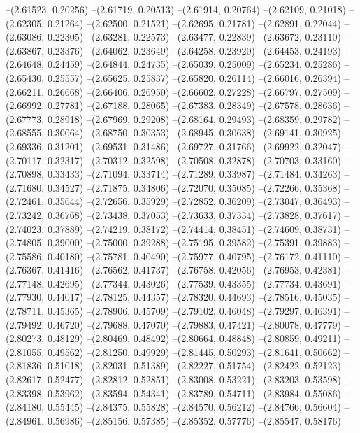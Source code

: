 --(2.61523, 0.20256)
--(2.61719, 0.20513)
--(2.61914, 0.20764)
--(2.62109, 0.21018)
--(2.62305, 0.21264)
--(2.62500, 0.21521)
--(2.62695, 0.21781)
--(2.62891, 0.22044)
--(2.63086, 0.22305)
--(2.63281, 0.22573)
--(2.63477, 0.22839)
--(2.63672, 0.23110)
--(2.63867, 0.23376)
--(2.64062, 0.23649)
--(2.64258, 0.23920)
--(2.64453, 0.24193)
--(2.64648, 0.24459)
--(2.64844, 0.24735)
--(2.65039, 0.25009)
--(2.65234, 0.25286)
--(2.65430, 0.25557)
--(2.65625, 0.25837)
--(2.65820, 0.26114)
--(2.66016, 0.26394)
--(2.66211, 0.26668)
--(2.66406, 0.26950)
--(2.66602, 0.27228)
--(2.66797, 0.27509)
--(2.66992, 0.27781)
--(2.67188, 0.28065)
--(2.67383, 0.28349)
--(2.67578, 0.28636)
--(2.67773, 0.28918)
--(2.67969, 0.29208)
--(2.68164, 0.29493)
--(2.68359, 0.29782)
--(2.68555, 0.30064)
--(2.68750, 0.30353)
--(2.68945, 0.30638)
--(2.69141, 0.30925)
--(2.69336, 0.31201)
--(2.69531, 0.31486)
--(2.69727, 0.31766)
--(2.69922, 0.32047)
--(2.70117, 0.32317)
--(2.70312, 0.32598)
--(2.70508, 0.32878)
--(2.70703, 0.33160)
--(2.70898, 0.33433)
--(2.71094, 0.33714)
--(2.71289, 0.33987)
--(2.71484, 0.34263)
--(2.71680, 0.34527)
--(2.71875, 0.34806)
--(2.72070, 0.35085)
--(2.72266, 0.35368)
--(2.72461, 0.35644)
--(2.72656, 0.35929)
--(2.72852, 0.36209)
--(2.73047, 0.36493)
--(2.73242, 0.36768)
--(2.73438, 0.37053)
--(2.73633, 0.37334)
--(2.73828, 0.37617)
--(2.74023, 0.37889)
--(2.74219, 0.38172)
--(2.74414, 0.38451)
--(2.74609, 0.38731)
--(2.74805, 0.39000)
--(2.75000, 0.39288)
--(2.75195, 0.39582)
--(2.75391, 0.39883)
--(2.75586, 0.40180)
--(2.75781, 0.40490)
--(2.75977, 0.40795)
--(2.76172, 0.41110)
--(2.76367, 0.41416)
--(2.76562, 0.41737)
--(2.76758, 0.42056)
--(2.76953, 0.42381)
--(2.77148, 0.42695)
--(2.77344, 0.43026)
--(2.77539, 0.43355)
--(2.77734, 0.43691)
--(2.77930, 0.44017)
--(2.78125, 0.44357)
--(2.78320, 0.44693)
--(2.78516, 0.45035)
--(2.78711, 0.45365)
--(2.78906, 0.45709)
--(2.79102, 0.46048)
--(2.79297, 0.46391)
--(2.79492, 0.46720)
--(2.79688, 0.47070)
--(2.79883, 0.47421)
--(2.80078, 0.47779)
--(2.80273, 0.48129)
--(2.80469, 0.48492)
--(2.80664, 0.48848)
--(2.80859, 0.49211)
--(2.81055, 0.49562)
--(2.81250, 0.49929)
--(2.81445, 0.50293)
--(2.81641, 0.50662)
--(2.81836, 0.51018)
--(2.82031, 0.51389)
--(2.82227, 0.51754)
--(2.82422, 0.52123)
--(2.82617, 0.52477)
--(2.82812, 0.52851)
--(2.83008, 0.53221)
--(2.83203, 0.53598)
--(2.83398, 0.53962)
--(2.83594, 0.54341)
--(2.83789, 0.54711)
--(2.83984, 0.55086)
--(2.84180, 0.55445)
--(2.84375, 0.55828)
--(2.84570, 0.56212)
--(2.84766, 0.56604)
--(2.84961, 0.56986)
--(2.85156, 0.57385)
--(2.85352, 0.57776)
--(2.85547, 0.58176)
